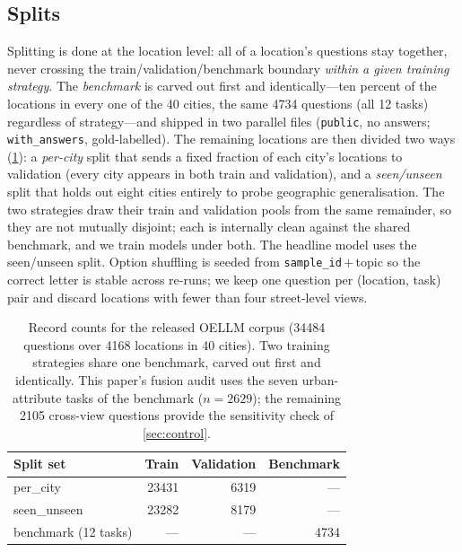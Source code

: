 \subsection{Splits}
\label{sec:splits}
Splitting is done at the location level: all of a location's questions stay together,
never crossing the train/validation/benchmark boundary \emph{within a given training
strategy}. The \emph{benchmark} is carved out first and identically---ten percent of
the locations in every one of the \num{40} cities, the same \num{4734} questions (all
\num{12} tasks) regardless of strategy---and shipped in two parallel files
(\texttt{public}, no answers; \texttt{with\_answers}, gold-labelled). The remaining
locations are then divided two ways (\cref{tab:dataset}): a \emph{per-city} split that
sends a fixed fraction of each city's locations to validation (every city appears in
both train and validation), and a \emph{seen/unseen} split that holds out eight
cities entirely to probe geographic generalisation. The two strategies draw their
train and validation pools from the same remainder, so they are not mutually disjoint;
each is internally clean against the shared benchmark, and we train models under both.
The headline model uses the seen/unseen split. Option shuffling is seeded from
\texttt{sample\_id}\,$+$\,topic so the correct letter is stable across re-runs; we
keep one question per (location, task) pair and discard locations with fewer than four
street-level views.

\begin{table}[t]
  \centering
  \caption{Record counts for the released OELLM corpus (\num{34484} questions over
  \num{4168} locations in \num{40} cities). Two training strategies share one
  benchmark, carved out first and identically. This paper's fusion audit uses the
  seven urban-attribute tasks of the benchmark ($n=\num{2629}$); the remaining
  \num{2105} cross-view questions provide the sensitivity check of \cref{sec:control}.}
  \label{tab:dataset}
  \setlength{\tabcolsep}{8pt}
  \begin{tabular}{@{}lrrr@{}}
    \toprule
    Split set & Train & Validation & Benchmark \\
    \midrule
    per\_city    & \num{23431} & \num{6319} & --- \\
    seen\_unseen & \num{23282} & \num{8179} & --- \\
    benchmark (12 tasks) & --- & --- & \num{4734} \\
    \bottomrule
  \end{tabular}
\end{table}

